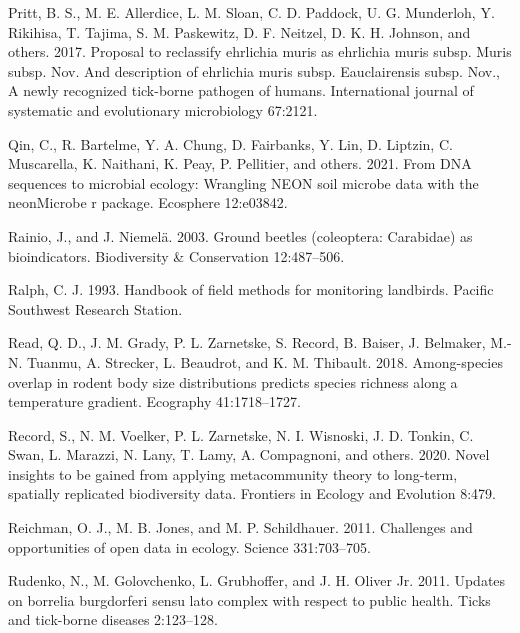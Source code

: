 \documentclass[
  12pt,
]{article}
\newlength{\cslhangindent}
\newlength{\cslentryspacingunit} %
\newenvironment{CSLReferences}[2] %
 {%
  \setlength{\parindent}{0pt}
  \ifodd #1
  \let\oldpar\par
  \def\par{\hangindent=\cslhangindent\oldpar}
  \fi
  \setlength{\parskip}{#2\cslentryspacingunit}
 }%
 {}
\begin{document}
\begin{CSLReferences}{1}{0}
\leavevmode{}%
Pritt, B. S., M. E. Allerdice, L. M. Sloan, C. D. Paddock, U. G. Munderloh, Y. Rikihisa, T. Tajima, S. M. Paskewitz, D. F. Neitzel, D. K. H. Johnson, and others. 2017. Proposal to reclassify ehrlichia muris as ehrlichia muris subsp. Muris subsp. Nov. And description of ehrlichia muris subsp. Eauclairensis subsp. Nov., A newly recognized tick-borne pathogen of humans. International journal of systematic and evolutionary microbiology 67:2121.

\leavevmode{}%
Qin, C., R. Bartelme, Y. A. Chung, D. Fairbanks, Y. Lin, D. Liptzin, C. Muscarella, K. Naithani, K. Peay, P. Pellitier, and others. 2021. From DNA sequences to microbial ecology: Wrangling NEON soil microbe data with the neonMicrobe r package. Ecosphere 12:e03842.

\leavevmode{}%
Rainio, J., and J. Niemelä. 2003. Ground beetles (coleoptera: Carabidae) as bioindicators. Biodiversity \& Conservation 12:487--506.

\leavevmode{}%
Ralph, C. J. 1993. Handbook of field methods for monitoring landbirds. Pacific Southwest Research Station.

\leavevmode{}%
Read, Q. D., J. M. Grady, P. L. Zarnetske, S. Record, B. Baiser, J. Belmaker, M.-N. Tuanmu, A. Strecker, L. Beaudrot, and K. M. Thibault. 2018. Among-species overlap in rodent body size distributions predicts species richness along a temperature gradient. Ecography 41:1718--1727.

\leavevmode{}%
Record, S., N. M. Voelker, P. L. Zarnetske, N. I. Wisnoski, J. D. Tonkin, C. Swan, L. Marazzi, N. Lany, T. Lamy, A. Compagnoni, and others. 2020. Novel insights to be gained from applying metacommunity theory to long-term, spatially replicated biodiversity data. Frontiers in Ecology and Evolution 8:479.

\leavevmode{}%
Reichman, O. J., M. B. Jones, and M. P. Schildhauer. 2011. Challenges and opportunities of open data in ecology. Science 331:703--705.

\leavevmode{}%
Rudenko, N., M. Golovchenko, L. Grubhoffer, and J. H. Oliver Jr. 2011. Updates on borrelia burgdorferi sensu lato complex with respect to public health. Ticks and tick-borne diseases 2:123--128.


\end{CSLReferences}
\end{document}
